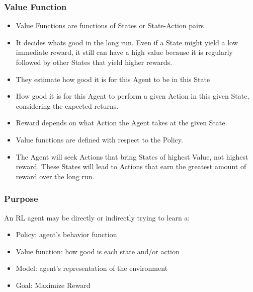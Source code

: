 \begin{frame}[fragile]\frametitle{Value Function}

\begin{itemize}
\item Value Functions are functions of States or State-Action pairs
\item It decides whats good in the long run. Even if a State might yield a low immediate reward, it still can have a high value because it is regularly followed by other States that yield higher rewards.
\item They estimate how good it is for this Agent to be in this State
\item How good it is for this Agent to perform a given Action in this given State, considering the expected returns.
\item Reward depends on what Action the Agent takes at the given State.
\item Value functions are defined with respect to the Policy.
\item The Agent will seek Actions that bring States of highest Value, not highest reward. These States will lead to Actions that earn the greatest amount of reward over the long run.
\end{itemize}

\end{frame}

\begin{frame}[fragile]\frametitle{Purpose}

An RL agent may be directly or indirectly trying to learn a:

\begin{itemize}
\item Policy: agent's behavior function
\item Value function: how good is each state and/or action
\item Model: agent's representation of the environment
\item Goal: Maximize Reward
\end{itemize}
\end{frame}


